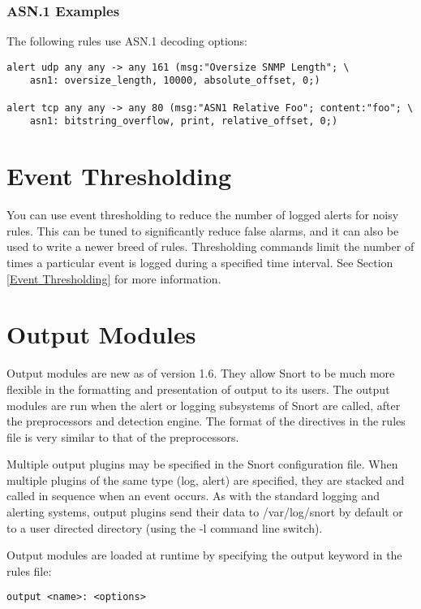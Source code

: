\documentclass[english]{report}
\begin{document}
\subsubsection{ASN.1 Examples}

The following rules use ASN.1 decoding options:

\begin{verbatim}
alert udp any any -> any 161 (msg:"Oversize SNMP Length"; \
    asn1: oversize_length, 10000, absolute_offset, 0;)
    
alert tcp any any -> any 80 (msg:"ASN1 Relative Foo"; content:"foo"; \
    asn1: bitstring_overflow, print, relative_offset, 0;)
\end{verbatim}

\section{Event Thresholding}
You can use event thresholding to reduce the number of logged alerts for noisy
rules.  This can be tuned to significantly reduce false alarms, and it can also
be used to write a newer breed of rules. Thresholding commands limit the number
of times a particular event is logged during a specified time interval. See Section \ref{Event Thresholding} for more information.

\section{Output Modules \label{output config}}

Output modules are new as of version 1.6. They allow Snort to be much
more flexible in the formatting and presentation of output to its
users. The output modules are run when the alert or logging subsystems
of Snort are called, after the preprocessors and detection engine.
The format of the directives in the rules file is very similar to
that of the preprocessors.

Multiple output plugins may be specified in the Snort configuration
file. When multiple plugins of the same type (log, alert) are specified,
they are stacked and called in sequence when an
event occurs. As with the standard logging and alerting systems, output
plugins send their data to /var/log/snort by default or to a user
directed directory (using the -l command line
switch).

Output modules are loaded at runtime by specifying the output keyword
in the rules file:

\begin{verbatim}
output <name>: <options>
\end{verbatim}
\end{document}
